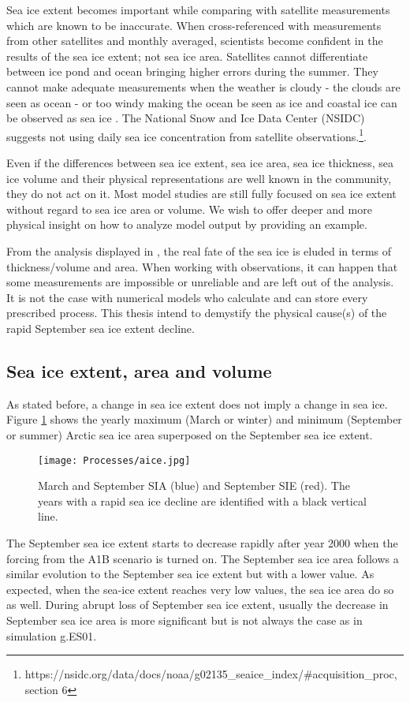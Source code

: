 Sea ice extent becomes important while comparing with satellite measurements which are known to be inaccurate. When cross-referenced with measurements from other satellites and  monthly averaged, scientists become confident in the results of the sea ice extent; not sea ice area. Satellites cannot differentiate between ice pond and ocean bringing higher errors during the summer. They cannot make adequate measurements when the weather is cloudy - the clouds are seen as ocean - or too windy making the ocean be seen as ice and  coastal ice can be observed as sea ice \citep{Cavalieri1995}. The National Snow and Ice Data Center (NSIDC) suggests not using daily sea ice concentration from satellite observations.\footnote{https://nsidc.org/data/docs/noaa/g02135\_seaice\_index/\#acquisition\_proc, section 6}. 

Even if the differences between sea ice extent, sea ice area, sea ice thickness, sea ice volume and their physical representations are well known in the community, they do not act on it. Most model studies are still fully focused on sea ice extent without regard to sea ice area or volume. We wish to offer deeper and more physical insight on how to analyze model output by providing an example. 

From the analysis displayed in \cite{ISI:000242942100008}, the real fate of the sea ice is eluded in terms of thickness/volume and area. When working with observations, it can happen that some measurements are impossible or unreliable and are left out of the analysis. It is not the case with numerical models who calculate and can store every prescribed process.  This thesis intend to demystify the physical cause(s) of the rapid September sea ice extent decline.  


\subsection{Sea ice extent, area and volume} \label{SIEvsSIA}

As stated before, a change in sea ice extent does not imply a change in sea ice. Figure \ref{cover} shows the yearly maximum (March or winter) and minimum (September or summer) Arctic sea ice area superposed on the September sea ice extent. 
\begin{figure}
\center
\noindent\texttt{[image: Processes/aice.jpg]}
\caption{March and September SIA (blue) and September SIE (red). The years with a rapid sea ice decline are identified with a black vertical line.}
\label{cover}
\end{figure}
The September sea ice extent starts to decrease rapidly after year 2000 when the forcing from the A1B scenario is turned on. The September sea ice area follows a similar evolution to the September sea ice extent but with a lower value. As expected, when the sea-ice extent reaches very low values, the sea ice area do so as well. During abrupt loss of September sea ice extent, usually the decrease in September sea ice area is more significant but is not always the case as in simulation g.ES01. 

